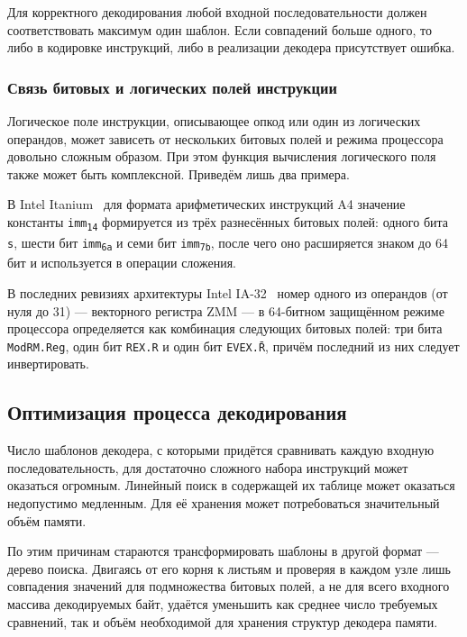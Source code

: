 Для корректного декодирования любой входной последовательности должен соответствовать максимум один шаблон. Если совпадений больше одного, то либо в кодировке инструкций, либо в реализации декодера присутствует ошибка. %

\subsubsection{Связь битовых и логических полей инструкции}

Логическое поле инструкции, описывающее опкод или один из логических операндов, может зависеть от нескольких битовых полей и режима процессора довольно сложным образом. При этом функция вычисления логического поля также может быть комплексной. Приведём лишь два примера.

\begin{enumerate*}
    \item В Intel Itanium~\cite{itanium-sdm} для формата арифметических инструкций A4 значение константы \texttt{imm\textsubscript{14}} формируется из трёх разнесённых битовых полей: одного бита \texttt{s}, шести бит \texttt{imm\textsubscript{6a}} и семи бит \texttt{imm\textsubscript{7b}}, после чего оно расширяется знаком до 64 бит и используется в операции сложения.
    
    \item В последних ревизиях архитектуры Intel IA-32~\cite{intel-x-reference} номер одного из операндов (от нуля до 31) ---   векторного регистра ZMM --- в 64-битном защищённом режиме процессора определяется как комбинация следующих битовых полей: три бита \texttt{ModRM.Reg}, один бит \texttt{REX.R} и один бит \texttt{EVEX.\={R}}, причём последний из них следует инвертировать.
\end{enumerate*}


\subsection{Оптимизация процесса декодирования}

Число шаблонов декодера, с которыми придётся сравнивать каждую входную последовательность, для достаточно сложного набора инструкций может оказаться огромным. Линейный поиск в содержащей их таблице может оказаться недопустимо медленным. Для её хранения может потребоваться значительный объём памяти.

По этим причинам стараются трансформировать шаблоны в другой формат --- дерево поиска. Двигаясь от его корня к листьям и проверяя в каждом узле лишь совпадения значений для подмножества битовых полей, а не для всего входного массива декодируемых байт, удаётся уменьшить как среднее число требуемых сравнений, так и объём необходимой для хранения структур декодера памяти.

